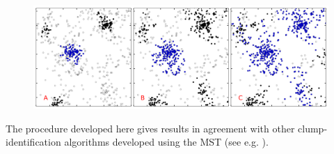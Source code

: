 \begin{figure}
\begin{center}
\includegraphics[width=0.9\columnwidth]{Figures/1_clumpsABC.png}
\end{center}
\caption{}
\label{Fig:1_clumpsABC}
\end{figure} 


The procedure developed here gives results in agreement with other clump-identification algorithms developed using the MST (see e.g. \citealt{Gutermuth2009,Kirk2011}).





